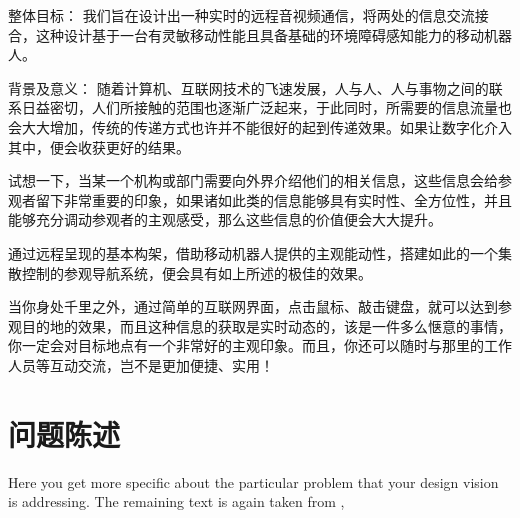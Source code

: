 

整体目标：
我们旨在设计出一种实时的远程音视频通信，将两处的信息交流接合，这种设计基于一台有灵敏移动性能且具备基础的环境障碍感知能力的移动机器人。

背景及意义：
随着计算机、互联网技术的飞速发展，人与人、人与事物之间的联系日益密切，人们所接触的范围也逐渐广泛起来，于此同时，所需要的信息流量也会大大增加，传统的传递方式也许并不能很好的起到传递效果。如果让数字化介入其中，便会收获更好的结果。

试想一下，当某一个机构或部门需要向外界介绍他们的相关信息，这些信息会给参观者留下非常重要的印象，如果诸如此类的信息能够具有实时性、全方位性，并且能够充分调动参观者的主观感受，那么这些信息的价值便会大大提升。

通过远程呈现的基本构架，借助移动机器人提供的主观能动性，搭建如此的一个集散控制的参观导航系统，便会具有如上所述的极佳的效果。

当你身处千里之外，通过简单的互联网界面，点击鼠标、敲击键盘，就可以达到参观目的地的效果，而且这种信息的获取是实时动态的，该是一件多么惬意的事情，你一定会对目标地点有一个非常好的主观印象。而且，你还可以随时与那里的工作人员等互动交流，岂不是更加便捷、实用！



\section{问题陈述}
\label{sec:problem}

\begin{remark} \color{blue}
Here you get more specific about the particular problem that your design vision is addressing.
The remaining text is again taken from \cite{Autodesk2008Fall},
\normalcolor
\end{remark}

